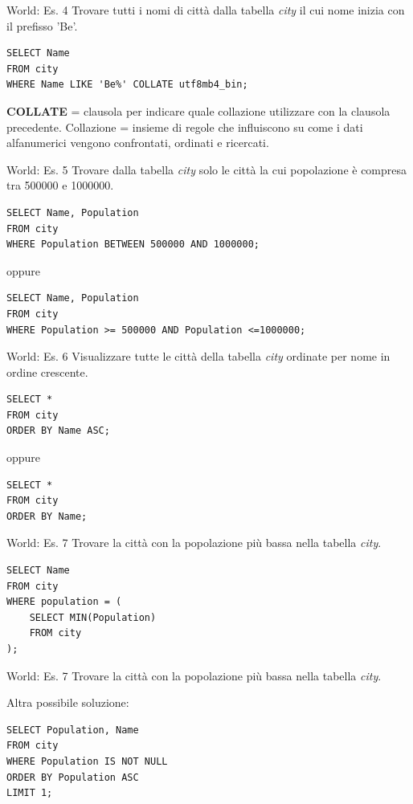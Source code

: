 \begin{frame}[fragile]{World: Es. 4}
Trovare tutti i nomi di citt\`a dalla tabella \textit{city} il cui nome inizia con il prefisso 'Be'.
\begin{lstlisting}
SELECT Name
FROM city
WHERE Name LIKE 'Be%' COLLATE utf8mb4_bin;
\end{lstlisting}
\textbf{COLLATE} = clausola per indicare quale collazione utilizzare con la clausola precedente.
\newline
\newline
Collazione = insieme di regole che influiscono su come i dati alfanumerici vengono confrontati, ordinati e ricercati.
\end{frame}

%
\begin{frame}[fragile]{World: Es. 5}
Trovare dalla tabella \textit{city} solo le citt\`a la cui popolazione \`e compresa tra 500000 e 1000000.
\pause
\begin{lstlisting}
SELECT Name, Population
FROM city
WHERE Population BETWEEN 500000 AND 1000000;
\end{lstlisting}
\pause
oppure
\begin{lstlisting}
SELECT Name, Population
FROM city
WHERE Population >= 500000 AND Population <=1000000;
\end{lstlisting}
\end{frame}
%
\begin{frame}[fragile]{World: Es. 6}
Visualizzare tutte le citt\`a della tabella \textit{city} ordinate per nome in ordine crescente.
\pause
\begin{lstlisting}
SELECT *
FROM city
ORDER BY Name ASC;
\end{lstlisting}
oppure
\pause
\begin{lstlisting}
SELECT *
FROM city
ORDER BY Name;
\end{lstlisting}
\end{frame}
%
\begin{frame}[fragile]{World: Es. 7}
Trovare la citt\`a con la popolazione pi\`u bassa nella tabella \textit{city}.
\pause
\vspace{-.1cm}
\begin{lstlisting}
SELECT Name
FROM city
WHERE population = (
    SELECT MIN(Population)
    FROM city
);
\end{lstlisting}
\end{frame}
%
\begin{frame}[fragile]{World: Es. 7}
Trovare la citt\`a con la popolazione pi\`u bassa nella tabella \textit{city}.

Altra possibile soluzione:
\vspace{-.1cm}
\begin{lstlisting}
SELECT Population, Name
FROM city
WHERE Population IS NOT NULL
ORDER BY Population ASC
LIMIT 1;
\end{lstlisting}
\end{frame}

